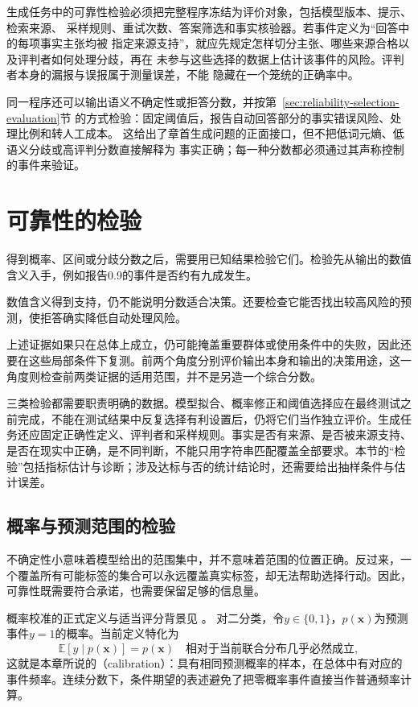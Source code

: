 生成任务中的可靠性检验必须把完整程序冻结为评价对象，包括模型版本、提示、检索来源、
采样规则、重试次数、答案筛选和事实核验器。若事件定义为“回答中的每项事实主张均被
指定来源支持”，就应先规定怎样切分主张、哪些来源合格以及评判者如何处理分歧，再在
未参与这些选择的数据上估计该事件的风险。评判者本身的漏报与误报属于测量误差，不能
隐藏在一个笼统的正确率中。

同一程序还可以输出语义不确定性或拒答分数，并按第~\ref{sec:reliability-selection-evaluation}节
的方式检验：固定阈值后，报告自动回答部分的事实错误风险、处理比例和转人工成本。
这给出了章首生成问题的正面接口，但不把低词元熵、低语义分歧或高评判分数直接解释为
事实正确；每一种分数都必须通过其声称控制的事件来验证。

\section{可靠性的检验}
\label{sec:reliability-evaluation}

得到概率、区间或分歧分数之后，需要用已知结果检验它们。检验先从输出的数值含义入手，例如报告0.9的事件是否约有九成发生。

数值含义得到支持，仍不能说明分数适合决策。还要检查它能否找出较高风险的预测，使拒答确实降低自动处理风险。

上述证据如果只在总体上成立，仍可能掩盖重要群体或使用条件中的失败，因此还要在这些局部条件下复测。前两个角度分别评价输出本身和输出的决策用途，这一角度则检查前两类证据的适用范围，并不是另造一个综合分数。

三类检验都需要职责明确的数据。模型拟合、概率修正和阈值选择应在最终测试之前完成，不能在测试结果中反复选择有利设置后，仍将它们当作独立评价。生成任务还应固定正确性定义、评判者和采样规则。事实是否有来源、是否被来源支持、是否在现实中正确，是不同判断，不能只用字符串匹配覆盖全部要求。本节的“检验”包括指标估计与诊断；涉及达标与否的统计结论时，还需要给出抽样条件与估计误差。

\subsection{概率与预测范围的检验}
\label{sec:reliability-output-evaluation}

不确定性小意味着模型给出的范围集中，并不意味着范围的位置正确。反过来，一个覆盖所有可能标签的集合可以永远覆盖真实标签，却无法帮助选择行动。因此，可靠性既需要符合承诺，也需要保留足够的信息量。

概率校准的正式定义与适当评分背景见
。
对二分类，令$y\in\{0,1\}$，$p(\bm{x})$为预测事件$y=1$的概率。当前定义特化为
\begin{equation}
 \mathbb E[y\mid p(\bm{x})]=p(\bm{x})
\quad\text{相对于当前联合分布几乎必然成立},
 \label{eq:reliability-calibration}
\end{equation}
这就是本章所说的（calibration）：具有相同预测概率的样本，在总体中有对应的事件频率。连续分数下，条件期望的表述避免了把零概率事件直接当作普通频率计算。

